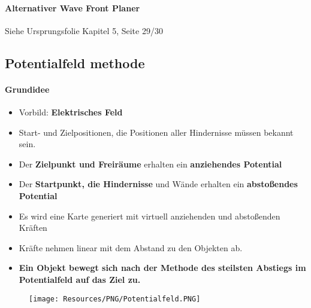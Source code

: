 \paragraph{Alternativer Wave Front Planer}
Siehe Ursprungsfolie Kapitel 5, Seite 29/30
\subsection{Potentialfeld methode}
\paragraph{Grundidee}
\begin{itemize}
	\item Vorbild: \textbf{Elektrisches Feld}
	\item Start- und Zielpositionen, die Positionen aller Hindernisse müssen bekannt sein.
	\item Der \textbf{Zielpunkt und Freiräume} erhalten ein \textbf{anziehendes Potential}
	\item Der \textbf{Startpunkt, die Hindernisse} und Wände erhalten ein \textbf{abstoßendes Potential}
	\item Es wird eine Karte generiert mit virtuell anziehenden und abstoßenden Kräften
	\item Kräfte nehmen linear mit dem Abstand zu den Objekten ab.
	\item \textbf{Ein Objekt bewegt sich nach der Methode des steilsten Abstiegs im Potentialfeld auf das Ziel zu.}
\end{itemize}
\begin{figure}[H]
	\begin{center}
		\texttt{[image: Resources/PNG/Potentialfeld.PNG]}
		\caption{}
		\label{fig:PNG/Potentialfeld.PNG}
	\end{center}
\end{figure}
